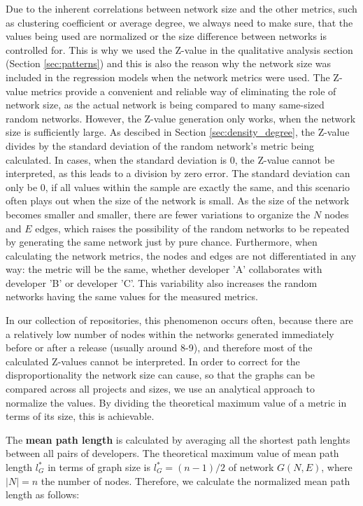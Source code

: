 Due to the inherent correlations between network size and the other metrics, such as clustering coefficient or average degree, we always need to make sure, that the values being used are normalized or the size difference between networks is controlled for. This is why we used the Z-value in the qualitative analysis section (Section \ref{sec:patterns}) and this is also the reason why the network size was included in the regression models when the network metrics were used. The Z-value metrics provide a convenient and reliable way of eliminating the role of network size, as the actual network is being compared to many same-sized random networks. However, the Z-value generation only works, when the network size is sufficiently large. As descibed in Section \ref{sec:density_degree}, the Z-value divides by the standard deviation of the random network's metric being calculated. In cases, when the standard deviation is $0$, the Z-value cannot be interpreted, as this leads to a division by zero error. The standard deviation can only be $0$, if all values within the sample are exactly the same, and this scenario often plays out when the size of the network is small. As the size of the network becomes smaller and smaller, there are fewer variations to organize the $N$ nodes and $E$ edges, which raises the possibility of the random networks to be repeated by generating the same network just by pure chance. Furthermore, when calculating the network metrics, the nodes and edges are not differentiated in any way: the metric will be the same, whether developer 'A' collaborates with developer 'B' or developer 'C'. This variability also increases the random networks having the same values for the measured metrics.

In our collection of repositories, this phenomenon occurs often, because there are a relatively low number of nodes within the networks generated immediately before or after a release (usually around 8-9), and therefore most of the calculated Z-values cannot be interpreted. In order to correct for the disproportionality the network size can cause, so that the graphs can be compared across all projects and sizes, we use an analytical approach to normalize the values. By dividing the theoretical maximum value of a metric in terms of its size, this is achievable.

The \textbf{mean path length} is calculated by averaging all the shortest path lenghts between all pairs of developers. The theoretical maximum value of mean path length $l_G^*$ in terms of graph size is $l_G^* = (n-1)/2$ of network $G(N,E)$, where $|N| = n$ the number of nodes. Therefore, we calculate the normalized mean path length as follows:


